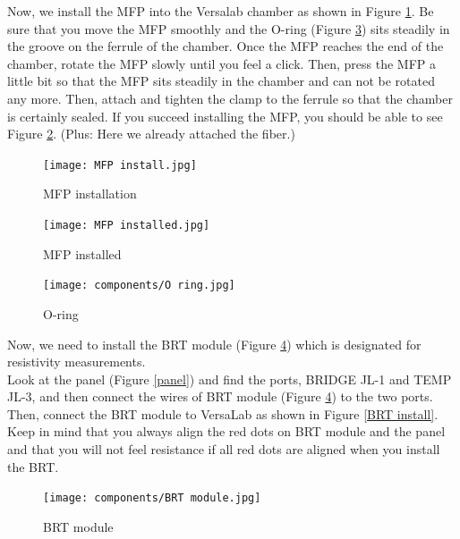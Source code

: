 \documentclass{article}
\begin{document}
            Now, we install the MFP into the Versalab chamber as shown in Figure \ref{MFP install}. Be sure that you move the MFP smoothly and the O-ring (Figure \ref{O-ring}) sits steadily in the groove on the ferrule of the chamber. Once the MFP reaches the end of the chamber, rotate the MFP slowly until you feel a click. Then, press the MFP a little bit so that the MFP sits steadily in the chamber and can not be rotated any more. Then, attach and tighten the clamp to the ferrule so that the chamber is certainly sealed. If you succeed installing the MFP, you should be able to see Figure \ref{MFP installed}. (Plus: Here we already attached the fiber.)
            
            \begin{figure}[H]
                \centering
                \texttt{[image: MFP install.jpg]}
                \caption{MFP installation}
                \label{MFP install}
            \end{figure}

            \begin{figure}[H]
                \centering
                \texttt{[image: MFP installed.jpg]}
                \caption{MFP installed}
                \label{MFP installed}
            \end{figure}

            \begin{figure}[H]
            \centering
            \texttt{[image: components/O ring.jpg]}
            \caption{O-ring}
            \label{O-ring}
            \end{figure}

            Now, we need to install the BRT module (Figure \ref{BRT}) which is designated for resistivity measurements.\\
            Look at the panel (Figure \ref{panel}) and find the ports, BRIDGE JL-1 and TEMP JL-3, and then connect the wires of BRT module (Figure \ref{BRT}) to the two ports. Then, connect the BRT module to VersaLab as shown in Figure \ref{BRT install}. Keep in mind that you always align the red dots on BRT module and the panel and that you will not feel resistance if all red dots are aligned when you install the BRT.\\

            \begin{figure}[H]
                \centering
                \texttt{[image: components/BRT module.jpg]}
                \caption{BRT module}
                \label{BRT}
            \end{figure}
\end{document}
